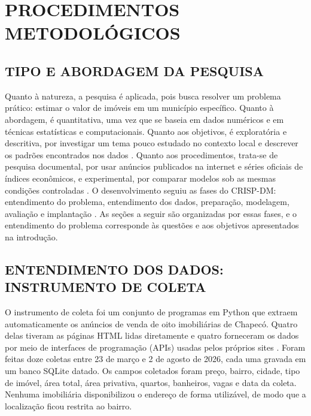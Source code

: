 \documentclass[
  article,
  a4paper,
  12pt,
  fleqn,
  oneside,
  chapter = TITLE,
  section = TITLE,
]{abntex2}
\begin{document}
\section{PROCEDIMENTOS METODOLÓGICOS}\label{sec:metod}

\subsection{TIPO E ABORDAGEM DA PESQUISA}

Quanto à natureza, a pesquisa é aplicada, pois busca resolver um problema prático: estimar o valor de imóveis em um município específico. Quanto à abordagem, é quantitativa, uma vez que se baseia em dados numéricos e em técnicas estatísticas e computacionais. Quanto aos objetivos, é exploratória e descritiva, por investigar um tema pouco estudado no contexto local e descrever os padrões encontrados nos dados \cite{gil2002}. Quanto aos procedimentos, trata-se de pesquisa documental, por usar anúncios publicados na internet e séries oficiais de índices econômicos, e experimental, por comparar modelos sob as mesmas condições controladas \cite{prodanov2013}. O desenvolvimento seguiu as fases do CRISP-DM: entendimento do problema, entendimento dos dados, preparação, modelagem, avaliação e implantação \cite{chapman2000,shearer2000}. As seções a seguir são organizadas por essas fases, e o entendimento do problema corresponde às questões e aos objetivos apresentados na introdução.

\subsection{ENTENDIMENTO DOS DADOS: INSTRUMENTO DE COLETA}\label{sec:coleta}

O instrumento de coleta foi um conjunto de programas em Python que extraem automaticamente os anúncios de venda de oito imobiliárias de Chapecó. Quatro delas tiveram as páginas HTML lidas diretamente e quatro forneceram os dados por meio de interfaces de programação (APIs) usadas pelos próprios sites \cite{mitchell2018}. Foram feitas doze coletas entre 23 de março e 2 de agosto de 2026, cada uma gravada em um banco SQLite datado. Os campos coletados foram preço, bairro, cidade, tipo de imóvel, área total, área privativa, quartos, banheiros, vagas e data da coleta. Nenhuma imobiliária disponibilizou o endereço de forma utilizável, de modo que a localização ficou restrita ao bairro.
\end{document}
